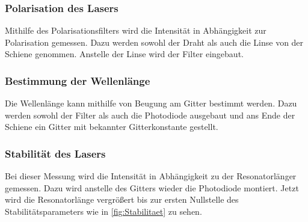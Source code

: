 \subsubsection{Polarisation des Lasers}
Mithilfe des Polarisationsfilters wird die Intensität in Abhängigkeit zur Polarisation gemessen. Dazu werden sowohl der Draht als auch die Linse von der Schiene genommen. Anstelle der Linse wird der Filter eingebaut.
\subsubsection{Bestimmung der Wellenlänge}

Die Wellenlänge kann mithilfe von Beugung am Gitter bestimmt werden. Dazu werden sowohl der Filter als auch die Photodiode ausgebaut und ans Ende der Schiene ein Gitter mit bekannter Gitterkonstante gestellt.
\subsubsection{Stabilität des Lasers}

Bei dieser Messung wird die Intensität in Abhängigkeit zu der Resonatorlänger gemessen. Dazu wird anstelle des Gitters wieder die Photodiode montiert. Jetzt wird die Resonatorlänge vergrößert bis zur ersten Nullstelle des Stabilitätsparameters wie in  \cref{fig:Stabilitaet} zu sehen.



